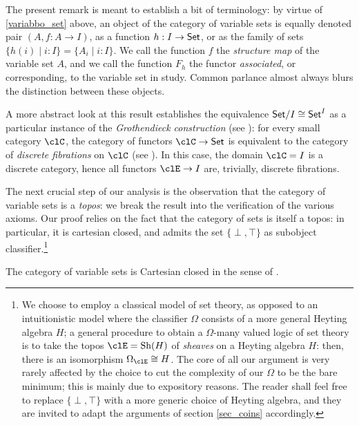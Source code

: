 \begin{notation}
	The present remark is meant to establish a bit of terminology: by virtue of \autoref{variabbo_set} above, an object of the category of variable sets is equally denoted pair $(A,f : A \to I)$, as a function $h : I \to \mathsf{Set}$, or as the family of sets $\{h(i) \mid i : I\} = \{A_i\mid i: I\}$. We call the function $f$ the \emph{structure map} of the variable set $A$, and we call the function $F_h$ the functor \emph{associated}, or corresponding, to the variable set in study. Common parlance almost always blurs the distinction between these objects.
\end{notation}
\begin{remark}
	A more abstract look at this result establishes the equivalence $\mathsf{Set}/I\cong \mathsf{Set}^I$ as a particular instance of the \emph{Grothendieck construction} (see \cite[1.1]{Leinster2004}): for every small category $\clC$, the category of functors $\clC\to\Set$ is equivalent to the category of \emph{discrete fibrations} on $\clC$ (see \cite[1.1]{Leinster2004}). In this case, the domain $\clC=I$ is a discrete category, hence all functors $\clE \to I$ are, trivially, discrete fibrations.
\end{remark}
\begin{remark}
	The next crucial step of our analysis is the observation that the category of variable sets is a \emph{topos}: we break the result into the verification of the various axioms. Our proof relies on the fact that the category of sets is itself a topos: in particular, it is cartesian closed, and admits the set $\{\perp,\top\}$ as subobject classifier.\footnote{We choose to employ a classical model of set theory, as opposed to an intuitionistic model where the classifier $\Omega$ consists of a more general Heyting algebra $H$; a general procedure to obtain a $\Omega$-many valued logic of set theory is to take the topos $\clE = \text{Sh}(H)$ of \emph{sheaves} on a Heyting algebra $H$: then, there is an isomorphism $\Omega_\clE\cong H$. The core of all our argument is very rarely affected by the choice to cut the complexity of our $\Omega$ to be the bare minimum; this is mainly due to expository reasons. The reader shall feel free to replace $\{\perp,\top\}$ with a more generic choice of Heyting algebra, and they are invited to adapt the arguments of section \autoref{sec_coins} accordingly.}
\end{remark}
\begin{proposition}\label{carclo}
	The category of variable sets is Cartesian closed in the sense of \cite[p.335]{Bor1}.
\end{proposition}
